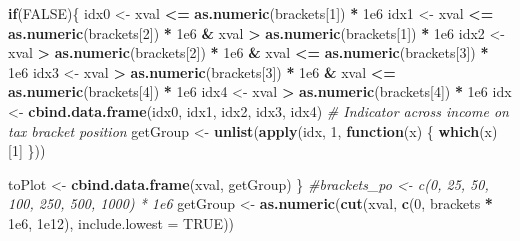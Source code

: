 \documentclass[]{article}
\newenvironment{Shaded}{\begin{snugshade}}{\end{snugshade}}
\newcommand{\CommentTok}[1]{\textcolor[rgb]{0.56,0.35,0.01}{\textit{#1}}}
\newcommand{\ControlFlowTok}[1]{\textcolor[rgb]{0.13,0.29,0.53}{\textbf{#1}}}
\newcommand{\DataTypeTok}[1]{\textcolor[rgb]{0.13,0.29,0.53}{#1}}
\newcommand{\DecValTok}[1]{\textcolor[rgb]{0.00,0.00,0.81}{#1}}
\newcommand{\FloatTok}[1]{\textcolor[rgb]{0.00,0.00,0.81}{#1}}
\newcommand{\KeywordTok}[1]{\textcolor[rgb]{0.13,0.29,0.53}{\textbf{#1}}}
\newcommand{\NormalTok}[1]{#1}
\newcommand{\OperatorTok}[1]{\textcolor[rgb]{0.81,0.36,0.00}{\textbf{#1}}}
\newcommand{\OtherTok}[1]{\textcolor[rgb]{0.56,0.35,0.01}{#1}}
\newcommand{\StringTok}[1]{\textcolor[rgb]{0.31,0.60,0.02}{#1}}
\begin{document}
\begin{Shaded}
\begin{Highlighting}[]
\ControlFlowTok{if}\NormalTok{(}\OtherTok{FALSE}\NormalTok{)\{}
\NormalTok{    idx0 <-}\StringTok{ }\NormalTok{xval }\OperatorTok{<=}\StringTok{ }\KeywordTok{as.numeric}\NormalTok{(brackets[}\DecValTok{1}\NormalTok{]) }\OperatorTok{*}\StringTok{ }\FloatTok{1e6}
\NormalTok{    idx1 <-}\StringTok{ }\NormalTok{xval }\OperatorTok{<=}\StringTok{ }\KeywordTok{as.numeric}\NormalTok{(brackets[}\DecValTok{2}\NormalTok{]) }\OperatorTok{*}\StringTok{ }\FloatTok{1e6} \OperatorTok{&}\StringTok{ }\NormalTok{xval }\OperatorTok{>}\StringTok{ }\KeywordTok{as.numeric}\NormalTok{(brackets[}\DecValTok{1}\NormalTok{]) }\OperatorTok{*}\StringTok{ }\FloatTok{1e6}
\NormalTok{    idx2 <-}\StringTok{ }\NormalTok{xval }\OperatorTok{>}\StringTok{ }\KeywordTok{as.numeric}\NormalTok{(brackets[}\DecValTok{2}\NormalTok{]) }\OperatorTok{*}\StringTok{ }\FloatTok{1e6} \OperatorTok{&}\StringTok{ }\NormalTok{xval }\OperatorTok{<=}\StringTok{ }\KeywordTok{as.numeric}\NormalTok{(brackets[}\DecValTok{3}\NormalTok{]) }\OperatorTok{*}\StringTok{ }\FloatTok{1e6}
\NormalTok{    idx3 <-}\StringTok{ }\NormalTok{xval }\OperatorTok{>}\StringTok{ }\KeywordTok{as.numeric}\NormalTok{(brackets[}\DecValTok{3}\NormalTok{]) }\OperatorTok{*}\StringTok{ }\FloatTok{1e6} \OperatorTok{&}\StringTok{ }\NormalTok{xval }\OperatorTok{<=}\StringTok{ }\KeywordTok{as.numeric}\NormalTok{(brackets[}\DecValTok{4}\NormalTok{]) }\OperatorTok{*}\StringTok{ }\FloatTok{1e6}
\NormalTok{    idx4 <-}\StringTok{ }\NormalTok{xval }\OperatorTok{>}\StringTok{ }\KeywordTok{as.numeric}\NormalTok{(brackets[}\DecValTok{4}\NormalTok{]) }\OperatorTok{*}\StringTok{ }\FloatTok{1e6}
\NormalTok{    idx <-}\StringTok{ }\KeywordTok{cbind.data.frame}\NormalTok{(idx0, idx1, idx2, idx3, idx4)}
   \CommentTok{# Indicator across income on tax bracket position}
\NormalTok{    getGroup <-}\StringTok{ }\KeywordTok{unlist}\NormalTok{(}\KeywordTok{apply}\NormalTok{(idx, }\DecValTok{1}\NormalTok{, }\ControlFlowTok{function}\NormalTok{(x) \{}
      \KeywordTok{which}\NormalTok{(x)[}\DecValTok{1}\NormalTok{]}
\NormalTok{    \}))}

\NormalTok{    toPlot <-}\StringTok{ }\KeywordTok{cbind.data.frame}\NormalTok{(xval, getGroup)  }
\NormalTok{\}}
    \CommentTok{#brackets_po <- c(0, 25, 50, 100, 250, 500, 1000) * 1e6}
\NormalTok{getGroup <-}\StringTok{ }\KeywordTok{as.numeric}\NormalTok{(}\KeywordTok{cut}\NormalTok{(xval, }\KeywordTok{c}\NormalTok{(}\DecValTok{0}\NormalTok{, brackets }\OperatorTok{*}\StringTok{ }\FloatTok{1e6}\NormalTok{, }\FloatTok{1e12}\NormalTok{), }\DataTypeTok{include.lowest =} \OtherTok{TRUE}\NormalTok{))}


\end{Highlighting}
\end{Shaded}
\end{document}
